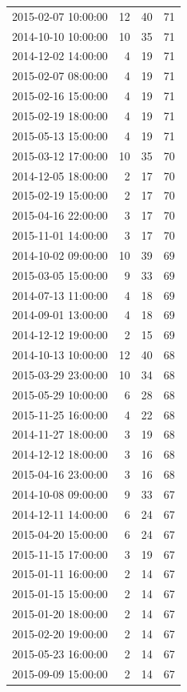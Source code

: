 \begin{tabular}{lrrr}
2015-02-07 10:00:00 & 12 & 40 & 71 \\
2014-10-10 10:00:00 & 10 & 35 & 71 \\
2014-12-02 14:00:00 & 4 & 19 & 71 \\
2015-02-07 08:00:00 & 4 & 19 & 71 \\
2015-02-16 15:00:00 & 4 & 19 & 71 \\
2015-02-19 18:00:00 & 4 & 19 & 71 \\
2015-05-13 15:00:00 & 4 & 19 & 71 \\
2015-03-12 17:00:00 & 10 & 35 & 70 \\
2014-12-05 18:00:00 & 2 & 17 & 70 \\
2015-02-19 15:00:00 & 2 & 17 & 70 \\
2015-04-16 22:00:00 & 3 & 17 & 70 \\
2015-11-01 14:00:00 & 3 & 17 & 70 \\
2014-10-02 09:00:00 & 10 & 39 & 69 \\
2015-03-05 15:00:00 & 9 & 33 & 69 \\
2014-07-13 11:00:00 & 4 & 18 & 69 \\
2014-09-01 13:00:00 & 4 & 18 & 69 \\
2014-12-12 19:00:00 & 2 & 15 & 69 \\
2014-10-13 10:00:00 & 12 & 40 & 68 \\
2015-03-29 23:00:00 & 10 & 34 & 68 \\
2015-05-29 10:00:00 & 6 & 28 & 68 \\
2015-11-25 16:00:00 & 4 & 22 & 68 \\
2014-11-27 18:00:00 & 3 & 19 & 68 \\
2014-12-12 18:00:00 & 3 & 16 & 68 \\
2015-04-16 23:00:00 & 3 & 16 & 68 \\
2014-10-08 09:00:00 & 9 & 33 & 67 \\
2014-12-11 14:00:00 & 6 & 24 & 67 \\
2015-04-20 15:00:00 & 6 & 24 & 67 \\
2015-11-15 17:00:00 & 3 & 19 & 67 \\
2015-01-11 16:00:00 & 2 & 14 & 67 \\
2015-01-15 15:00:00 & 2 & 14 & 67 \\
2015-01-20 18:00:00 & 2 & 14 & 67 \\
2015-02-20 19:00:00 & 2 & 14 & 67 \\
2015-05-23 16:00:00 & 2 & 14 & 67 \\
2015-09-09 15:00:00 & 2 & 14 & 67 \\

\end{tabular}
